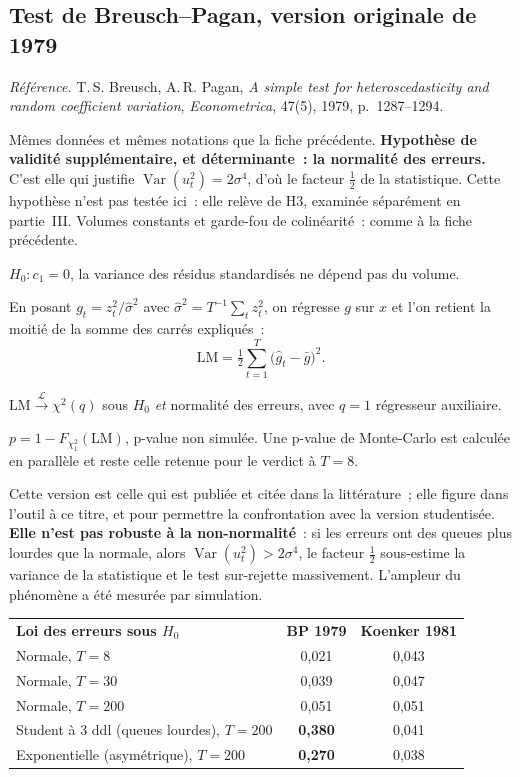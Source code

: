\documentclass[a4paper,11pt]{article}
\newcommand{\refl}[1]{{\small\textcolor{maincolor!70!black}{\textit{Référence.} #1}}\par\smallskip}
\newcounter{ficheid}
\newenvironment{fiche}[1]{%
  \stepcounter{ficheid}%
  \phantomsection
  \subsection{#1}%
  \label{fiche:\theficheid}%
}{%
  \end{description}\vspace{0.5em}%
}
\newcommand{\Cadre}{%
  \begin{description}[leftmargin=0pt, style=unboxed, itemsep=3pt, topsep=3pt, parsep=2pt]%
  \item[\textcolor{financeblue}{\textbf{1. Cadre, notations et hypothèses de validité (non testées).}}]}
\newcommand{\Hzero}{\item[\textcolor{financeblue}{\textbf{2. Hypothèse nulle.}}]}
\newcommand{\Stat}{\item[\textcolor{financeblue}{\textbf{3. Statistique de test.}}]}
\newcommand{\Loi}{\item[\textcolor{financeblue}{\textbf{4. Loi sous $H_0$.}}]}
\newcommand{\Pval}{\item[\textcolor{financeblue}{\textbf{5. p-value.}}]}
\newcommand{\Usage}{\item[\textcolor{financeblue}{\textbf{6. Usage et limites.}}]}
\begin{document}
\begin{fiche}{Test de Breusch--Pagan, version originale de 1979}
\label{fiche:breusch-pagan-1979}%
\refl{T.\,S. Breusch, A.\,R. Pagan, \emph{A simple test for heteroscedasticity and random
coefficient variation}, \emph{Econometrica}, 47(5), 1979, p.~1287--1294.}
\Cadre
Mêmes données et mêmes notations que la fiche précédente. \textbf{Hypothèse de validité
supplémentaire, et déterminante~: la normalité des erreurs.} C'est elle qui justifie
$\operatorname{Var}(u_t^2) = 2\sigma^4$, d'où le facteur $\tfrac12$ de la statistique. Cette
hypothèse n'est pas testée ici~: elle relève de H3, examinée séparément en partie~III. Volumes
constants et garde-fou de colinéarité~: comme à la fiche précédente.
\Hzero
$H_0 : c_1 = 0$, la variance des résidus standardisés ne dépend pas du volume.
\Stat
En posant $g_t = z_t^2 / \hat\sigma^2$ avec $\hat\sigma^2 = T^{-1}\sum_t z_t^2$, on régresse $g$
sur $x$ et l'on retient la moitié de la somme des carrés expliqués~:
\[
  \mathrm{LM} = \tfrac{1}{2}\sum_{t=1}^{T}\big(\hat g_t - \bar g\big)^2 .
\]
\Loi
$\mathrm{LM} \xrightarrow{\ \mathcal{L}\ } \chi^2(q)$ sous $H_0$ \emph{et} normalité des erreurs,
avec $q = 1$ régresseur auxiliaire.
\Pval
$p = 1 - F_{\chi^2_1}(\mathrm{LM})$, p-value non simulée. Une p-value de Monte-Carlo est calculée
en parallèle et reste celle retenue pour le verdict à $T = 8$.
\Usage
Cette version est celle qui est publiée et citée dans la littérature~; elle figure dans l'outil à
ce titre, et pour permettre la confrontation avec la version studentisée. \textbf{Elle n'est pas
robuste à la non-normalité}~: si les erreurs ont des queues plus lourdes que la normale, alors
$\operatorname{Var}(u_t^2) > 2\sigma^4$, le facteur $\tfrac12$ sous-estime la variance de la
statistique et le test sur-rejette massivement. L'ampleur du phénomène a été mesurée par
simulation.

\begin{center}
\small
{}
\begin{tabular}{@{}p{6.4cm}cc@{}}
\rowcolor{tableheader}
\textcolor{financeblue}{\textbf{Loi des erreurs sous $H_0$}} &
\textcolor{financeblue}{\textbf{BP 1979}} &
\textcolor{financeblue}{\textbf{Koenker 1981}} \\
Normale, $T = 8$    & 0,021 & 0,043 \\
Normale, $T = 30$   & 0,039 & 0,047 \\
Normale, $T = 200$  & 0,051 & 0,051 \\
Student à 3 ddl (queues lourdes), $T = 200$ & \textbf{0,380} & 0,041 \\
Exponentielle (asymétrique), $T = 200$      & \textbf{0,270} & 0,038 \\
\end{tabular}
\end{center}


\end{fiche}
\end{document}
